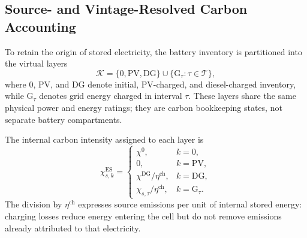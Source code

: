 \documentclass[times]{elsarticle}
\begin{document}
\subsection{Source- and Vintage-Resolved Carbon Accounting}

To retain the origin of stored electricity, the battery inventory is partitioned
into the virtual layers
\begin{equation}
\mathcal K=\{0,\mathrm{PV},\mathrm{DG}\}
\cup\{\mathrm{G}_\tau:\tau\in\mathcal T\},
\label{eq:layers}
\end{equation}
where $0$, $\mathrm{PV}$, and $\mathrm{DG}$ denote initial, PV-charged, and
diesel-charged inventory, while $\mathrm{G}_\tau$ denotes grid energy charged
in interval $\tau$.
These layers share the same physical power and energy ratings; they are carbon
bookkeeping states, not separate battery compartments.

The internal carbon intensity assigned to each layer is
\begin{equation}
\chi^{\mathrm{ES}}_{s,k}=
\begin{cases}
\chi^0,&k=0,\\
0,&k=\mathrm{PV},\\
\chi^{\mathrm{DG}}/\eta^{\mathrm{ch}},&k=\mathrm{DG},\\
\chi_{s,\tau}/\eta^{\mathrm{ch}},&k=\mathrm{G}_\tau.
\end{cases}
\label{eq:layer_intensity}
\end{equation}
The division by $\eta^{\mathrm{ch}}$ expresses source emissions per unit of
internal stored energy: charging losses reduce energy entering the cell but do
not remove emissions already attributed to that electricity.
\end{document}
